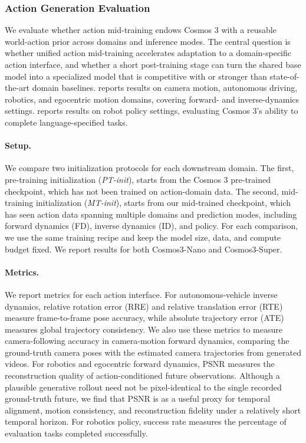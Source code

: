 \subsubsection{Action Generation Evaluation}
\label{subsec::action_benchmarks}

We evaluate whether action mid-training endows Cosmos 3 with a reusable world-action prior across domains and inference modes.
The central question is whether unified action mid-training accelerates adaptation to a domain-specific action interface, and whether a short post-training stage can turn the shared base model into a specialized model that is competitive with or stronger than state-of-the-art domain baselines.
 reports results on camera motion, autonomous driving, robotics, and egocentric motion domains, covering forward- and inverse-dynamics settings.
 reports results on robot policy settings, evaluating Cosmos 3's ability to complete language-specified tasks.

\paragraph{Setup.} We compare two initialization protocols for each downstream domain. The first, pre-training initialization (\textit{PT-init}), starts from the Cosmos 3 pre-trained checkpoint, which has not been trained on action-domain data. The second, mid-training initialization (\textit{MT-init}), starts from our mid-trained checkpoint, which has seen action data spanning multiple domains and prediction modes, including forward dynamics (FD), inverse dynamics (ID), and policy. For each comparison, we use the same training recipe and keep the model size, data, and compute budget fixed. We report results for both Cosmos3-Nano and Cosmos3-Super.

\paragraph{Metrics.} We report metrics for each action interface. For autonomous-vehicle inverse dynamics, relative rotation error (RRE) and relative translation error (RTE) measure frame-to-frame pose accuracy, while absolute trajectory error (ATE) measures global trajectory consistency. We also use these metrics to measure camera-following accuracy in camera-motion forward dynamics, comparing the ground-truth camera poses with the estimated camera trajectories from generated videos. For robotics and egocentric forward dynamics, PSNR measures the reconstruction quality of action-conditioned future observations. Although a plausible generative rollout need not be pixel-identical to the single recorded ground-truth future, we find that PSNR is as a useful proxy for temporal alignment, motion consistency, and reconstruction fidelity under a relatively short temporal horizon. For robotics policy, success rate measures the percentage of evaluation tasks completed successfully.

